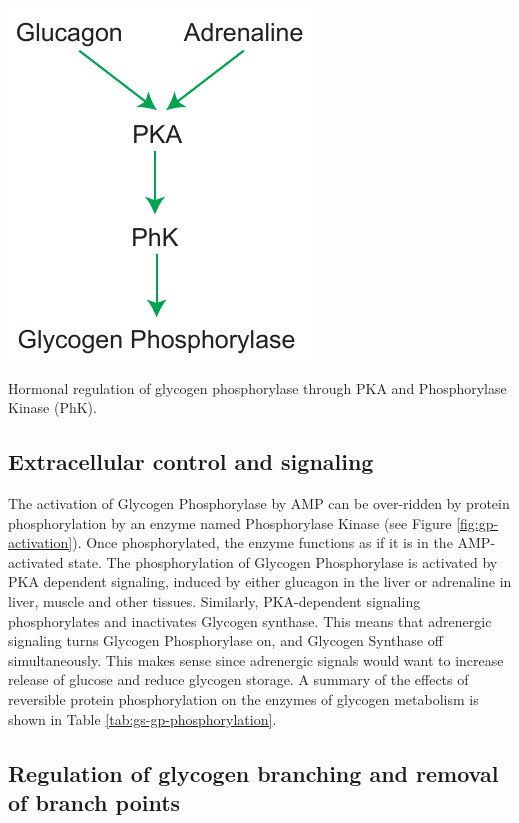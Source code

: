 \documentclass{tufte-handout}
\begin{document}
\begin{marginfigure}
\includegraphics{figures/gp-activation.pdf}
\caption{Hormonal regulation of glycogen phosphorylase through PKA and Phosphorylase Kinase (PhK).}
\label{fig:gp-activation}
\end{marginfigure}

\subsection{Extracellular control and signaling}

The activation of Glycogen Phosphorylase by AMP can be over-ridden by protein phosphorylation by an enzyme named Phosphorylase Kinase (see Figure \ref{fig:gp-activation}).  Once phosphorylated, the enzyme functions as if it is in the AMP-activated state.  The phosphorylation of Glycogen Phosphorylase is activated by PKA dependent signaling, induced by either glucagon in the liver or adrenaline in liver, muscle and other tissues.  Similarly, PKA-dependent signaling phosphorylates and inactivates Glycogen synthase.  This means that adrenergic signaling turns Glycogen Phosphorylase on, and Glycogen Synthase off simultaneously. This makes sense since adrenergic signals would want to increase release of glucose and reduce glycogen storage. A summary of the effects of reversible protein phosphorylation on the enzymes of glycogen metabolism is shown in Table \ref{tab:gs-gp-phosphorylation}.

\subsection{Regulation of glycogen branching and removal of branch points}
\end{document}
